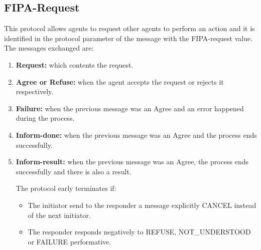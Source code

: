 \subsection{FIPA-Request}
This protocol allows agents to request other agents to perform an action and it is identified in the protocol parameter of the message with the FIPA-request value. The messages exchanged are:
\begin{enumerate}


\item \textbf{Request:} which contents the request.
\item \textbf{Agree or Refuse:} when the agent accepts the request or rejects it respectively.
\item \textbf{Failure:} when the previous message was an Agree and an error happened during the process.
\item \textbf{Inform-done:} when the previous message was an Agree and the process ends successfully.
\item \textbf{Inform-result:} when the previous message was an Agree, the process ends successfully and there is also a result.

The protocol early terminates if:
\begin{itemize}
\item The initiator send  to the responder a message explicitly CANCEL  instead of the next initiator.
\item The responder responds negatively to REFUSE, NOT\_UNDERSTOOD or FAILURE performative.
\end{itemize}
\end{enumerate}









